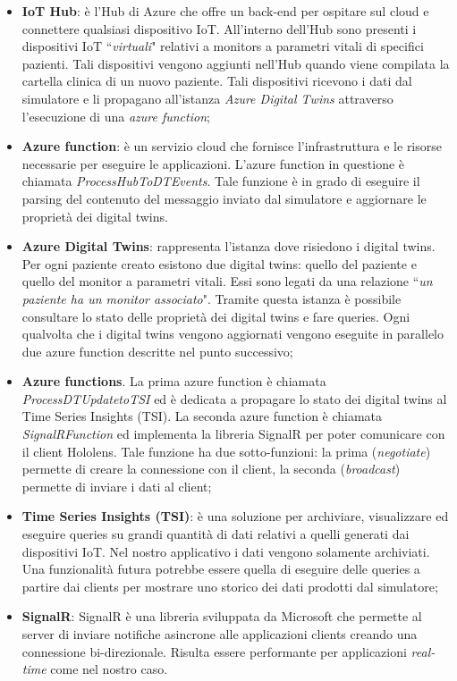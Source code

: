 \begin{itemize}

    \item \textbf{IoT Hub}: è l'Hub di Azure che offre un back-end per ospitare sul cloud e connettere qualsiasi dispositivo IoT. All'interno dell'Hub sono presenti i dispositivi IoT ``\textit{virtuali}" relativi a monitors a parametri vitali di specifici pazienti. Tali dispositivi vengono aggiunti nell'Hub quando viene compilata la cartella clinica di un nuovo paziente. Tali dispositivi ricevono i dati dal simulatore e li propagano all'istanza \textit{Azure Digital Twins} attraverso l'esecuzione di una \textit{azure function};
    
    \item \textbf{Azure function}: è un servizio cloud che fornisce l'infrastruttura e le risorse necessarie per eseguire le applicazioni. L'azure function in questione è chiamata \textit{ProcessHubToDTEvents}. Tale funzione è in grado di eseguire il parsing del contenuto del messaggio inviato dal simulatore e aggiornare le proprietà dei digital twins.
    
    \item \textbf{Azure Digital Twins}: rappresenta l'istanza dove risiedono i digital twins. Per ogni paziente creato esistono due digital twins: quello del paziente e quello del monitor a parametri vitali. Essi sono legati da una relazione ``\textit{un paziente ha un monitor associato}". Tramite questa istanza è possibile consultare lo stato delle proprietà dei digital twins e fare queries. Ogni qualvolta che i digital twins vengono aggiornati vengono eseguite in parallelo due azure function descritte nel punto successivo;
    
    \item \textbf{Azure functions}. La prima azure function è chiamata \textit{ProcessDTUpdatetoTSI} ed è dedicata a propagare lo stato dei digital twins al Time Series Insights (TSI). La seconda azure function è chiamata \textit{SignalRFunction} ed implementa la libreria SignalR per poter comunicare con il client Hololens. Tale funzione ha due sotto-funzioni: la prima (\textit{negotiate}) permette di creare la connessione con il client, la seconda (\textit{broadcast}) permette di inviare i dati al client;
    
    \item \textbf{Time Series Insights (TSI)}: è una soluzione per archiviare, visualizzare ed eseguire queries su grandi quantità di dati relativi a quelli generati dai dispositivi IoT. Nel nostro applicativo i dati vengono solamente archiviati. Una funzionalità futura potrebbe essere quella di eseguire delle queries a partire dai clients per mostrare uno storico dei dati prodotti dal simulatore;
    
    \item \textbf{SignalR}: SignalR è una libreria sviluppata da Microsoft che permette al server di inviare notifiche asincrone alle applicazioni clients creando una connessione bi-direzionale. Risulta essere performante per applicazioni \textit{real-time} come nel nostro caso.
\end{itemize}

